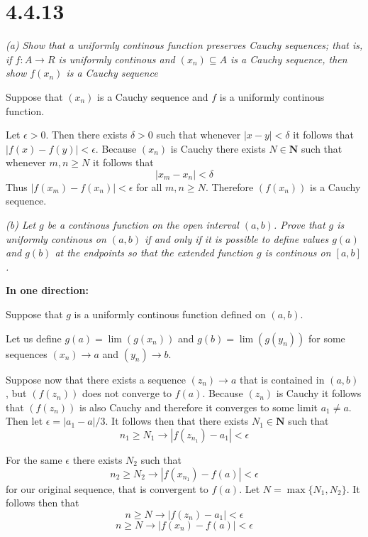 \documentclass[11pt,oneside,titlepage]{book}
\begin{document}
\section*{4.4.13}

\textit{(a) Show that a uniformly continous function preserves Cauchy
  sequences; that is, if $f: A \to R$ is uniformly continous and
  $(x_n) \subseteq A$ is a Cauchy sequence, then show $f(x_n)$ is a
  Cauchy sequence}

Suppose that $(x_n)$ is a Cauchy sequence and $f$ is a uniformly continous function.

Let $\epsilon > 0$. Then there exists $\delta > 0$ such that whenever
$|x - y| < \delta$ it follows that $|f(x) - f(y)| < \epsilon$.
Because $(x_n)$ is Cauchy there exists 
 $N \in \textbf{N}$ such that whenever
$m,n \geq N$ it follows that
$$|x_m - x_n| < \delta$$
Thus $|f(x_m) - f(x_n)| < \epsilon$ for all $m, n \geq N$. Therefore
$(f(x_n))$ is a Cauchy sequence.

\textit{(b) Let $g$ be a continous function on the open interval $(a, b)$.
  Prove that $g$ is uniformly continous on $(a, b)$ if and only if it is
  possible to define values $g(a)$ and $g(b)$ at the endpoints so that the
  extended function $g$ is continous on $[a, b]$.}

\textbf{In one direction: }

Suppose that $g$ is a uniformly continous function defined on $(a, b)$.

Let us define $g(a) = \lim(g(x_n))$ and $g(b) = \lim(g(y_n))$
for some sequences $(x_n) \to a$ and $(y_n) \to b$.


Suppose now that there exists a sequence $(z_n) \to a$ that is contained in
$(a, b)$ , but
$(f(z_n))$ does not converge to $f(a)$. Because $(z_n)$ is Cauchy it follows
that $(f(z_n))$ is also Cauchy and therefore it converges to some limit
$a_1 \neq a$. Then let $\epsilon = |a_1 - a| / 3$. It follows then that
there exists $N_1 \in \textbf{N}$ such that
$$n_1 \geq N_1 \to |f(z_{n_1}) - a_1| < \epsilon$$

For the same $\epsilon$ there exists $N_2$ such that 
$$n_2 \geq N_2 \to |f(x_{n_1}) - f(a)| < \epsilon$$
for our original sequence, that is convergent to $f(a)$.
Let $N = \max\{N_1, N_2\}$. It follows then that
$$n \geq N \to |f(z_n) - a_1| < \epsilon$$
$$n \geq N \to |f(x_n) - f(a)| < \epsilon$$
\end{document}
